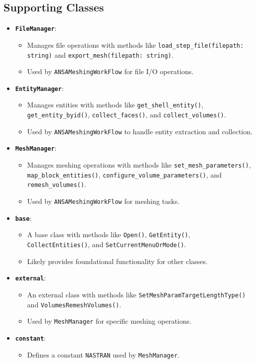 \documentclass{book}
\begin{document}
\begin{itemize}[leftmargin=*,label=\textbullet]
\begin{itemize}
\subsection{Supporting Classes}
\begin{itemize}
    \item \textbf{\texttt{FileManager}}:
    \begin{itemize}
        \item Manages file operations with methods like \texttt{load\_step\_file(filepath: string)} and \texttt{export\_mesh(filepath: string)}.
        \item Used by \texttt{ANSAMeshingWorkFlow} for file I/O operations.
    \end{itemize}
    \item \textbf{\texttt{EntityManager}}:
    \begin{itemize}
        \item Manages entities with methods like \texttt{get\_shell\_entity()}, \texttt{get\_entity\_byid()}, \texttt{collect\_faces()}, and \texttt{collect\_volumes()}.
        \item Used by \texttt{ANSAMeshingWorkFlow} to handle entity extraction and collection.
    \end{itemize}
    \item \textbf{\texttt{MeshManager}}:
    \begin{itemize}
        \item Manages meshing operations with methods like \texttt{set\_mesh\_parameters()}, \texttt{map\_block\_entities()}, \texttt{configure\_volume\_parameters()}, and \texttt{remesh\_volumes()}.
        \item Used by \texttt{ANSAMeshingWorkFlow} for meshing tasks.
    \end{itemize}
    \item \textbf{\texttt{base}}:
    \begin{itemize}
        \item A base class with methods like \texttt{Open()}, \texttt{GetEntity()}, \texttt{CollectEntities()}, and \texttt{SetCurrentMenuOrMode()}.
        \item Likely provides foundational functionality for other classes.
    \end{itemize}
    \item \textbf{\texttt{external}}:
    \begin{itemize}
        \item An external class with methods like \texttt{SetMeshParamTargetLengthType()} and \texttt{VolumesRemeshVolumes()}.
        \item Used by \texttt{MeshManager} for specific meshing operations.
    \end{itemize}
    \item \textbf{\texttt{constant}}:
    \begin{itemize}
        \item Defines a constant \texttt{NASTRAN} used by \texttt{MeshManager}.
    \end{itemize}
\end{itemize}


\end{itemize}
\end{itemize}
\end{document}
